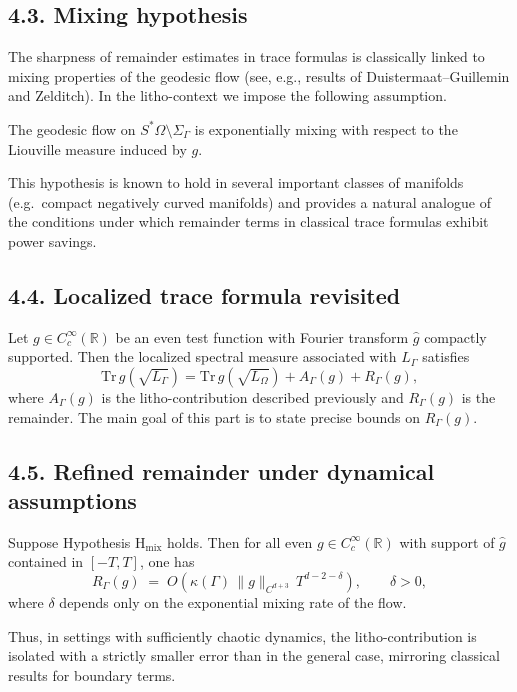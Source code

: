 \subsection*{4.3. Mixing hypothesis}
The sharpness of remainder estimates in trace formulas is classically linked to mixing properties of the geodesic flow (see, e.g., results of Duistermaat--Guillemin and Zelditch). In the litho-context we impose the following assumption.

\begin{definition}
The geodesic flow on $S^*\Omega\setminus\Sigma_\Gamma$ is exponentially mixing with respect to the Liouville measure induced by $g$.
\end{definition}

This hypothesis is known to hold in several important classes of manifolds (e.g.\ compact negatively curved manifolds) and provides a natural analogue of the conditions under which remainder terms in classical trace formulas exhibit power savings.

\subsection*{4.4. Localized trace formula revisited}
Let $g\in C_c^\infty(\mathbb{R})$ be an even test function with Fourier transform $\widehat g$ compactly supported. Then the localized spectral measure associated with $L_\Gamma$ satisfies
\[
\mathrm{Tr}\, g(\sqrt{L_\Gamma}) 
= \mathrm{Tr}\, g(\sqrt{L_\Omega})
+ A_\Gamma(g) 
+ R_\Gamma(g),
\]
where $A_\Gamma(g)$ is the litho-contribution described previously and $R_\Gamma(g)$ is the remainder. The main goal of this part is to state precise bounds on $R_\Gamma(g)$.

\subsection*{4.5. Refined remainder under dynamical assumptions}
\begin{theorem}\label{thm:refined-remainder}
Suppose Hypothesis H$_{\mathrm{mix}}$ holds. Then for all even $g\in C_c^\infty(\mathbb{R})$ with support of $\widehat g$ contained in $[-T,T]$, one has
\[
R_\Gamma(g) \;=\; O\!\left( \kappa(\Gamma)\,\|g\|_{C^{d+3}}\,
T^{d-2-\delta}\right), \qquad \delta>0,
\]
where $\delta$ depends only on the exponential mixing rate of the flow.
\end{theorem}

\noindent
Thus, in settings with sufficiently chaotic dynamics, the litho-contribution is isolated with a strictly smaller error than in the general case, mirroring classical results for boundary terms.

